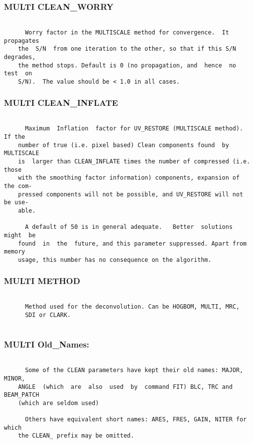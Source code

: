 \subsubsection{MULTI CLEAN\_WORRY}
\begin{verbatim}

      Worry factor in the MULTISCALE method for convergence.  It  propagates
    the  S/N  from one iteration to the other, so that if this S/N degrades,
    the method stops. Default is 0 (no propagation, and  hence  no  test  on
    S/N).  The value should be < 1.0 in all cases.

\end{verbatim}
\subsubsection{MULTI CLEAN\_INFLATE}
\begin{verbatim}

      Maximum  Inflation  factor for UV_RESTORE (MULTISCALE method).  If the
    number of true (i.e. pixel based) Clean components found  by  MULTISCALE
    is  larger than CLEAN_INFLATE times the number of compressed (i.e. those
    with the smoothing factor information) components, expansion of the com-
    pressed components will not be possible, and UV_RESTORE will not be use-
    able.

      A default of 50 is in general adequate.   Better  solutions  might  be
    found  in  the  future, and this parameter suppressed. Apart from memory
    usage, this number has no consequence on the algorithm.

\end{verbatim}
\subsubsection{MULTI METHOD}
\begin{verbatim}

      Method used for the deconvolution. Can be HOGBOM, MULTI, MRC,
      SDI or CLARK.


\end{verbatim}
\subsubsection{MULTI Old\_Names:}
\begin{verbatim}

      Some of the CLEAN parameters have kept their old names: MAJOR,  MINOR,
    ANGLE  (which  are  also  used  by  command FIT) BLC, TRC and BEAM_PATCH
    (which are seldom used)

      Others have equivalent short names: ARES, FRES, GAIN, NITER for  which
    the CLEAN_ prefix may be omitted.

\end{verbatim}
